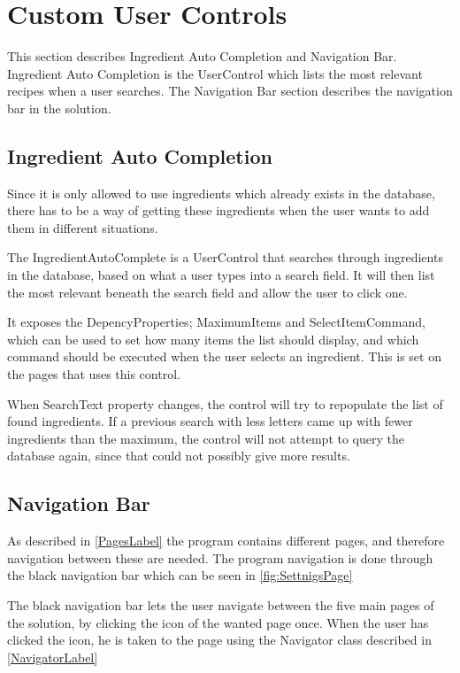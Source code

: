 \section{Custom User Controls}

This section describes Ingredient Auto Completion and Navigation Bar. Ingredient Auto Completion is the UserControl which lists the most relevant recipes when a user searches. The Navigation Bar section describes the navigation bar in the solution.

\subsection{Ingredient Auto Completion} \label{sec:AutoComplete}
Since it is only allowed to use ingredients which already exists in the database, there has to be a way of getting these ingredients when the user wants to add them in different situations.

The IngredientAutoComplete is a UserControl that searches through ingredients in the database, based on what a user types into a search field. It will then list the most relevant beneath the search field and allow the user to click one.

It exposes the DepencyProperties; MaximumItems and SelectItemCommand, which can be used to set how many items the list should display, and which command should be executed when the user selects an ingredient. This is set on the pages that uses this control.

When SearchText property changes, the control will try to repopulate the list of found ingredients. If a previous search with less letters came up with fewer ingredients than the maximum, the control will not attempt to query the database again, since that could not possibly give more results.

\subsection{Navigation Bar}

As described in \cref{PagesLabel} the program contains different pages, and therefore navigation between these are needed. The program navigation is done through the black navigation bar which can be seen in \cref{fig:SettnigsPage}

The black navigation bar lets the user navigate between the five main pages of the solution, by clicking the icon of the wanted page once. When the user has clicked the icon, he is taken to the page using the Navigator class described in \cref{NavigatorLabel}
